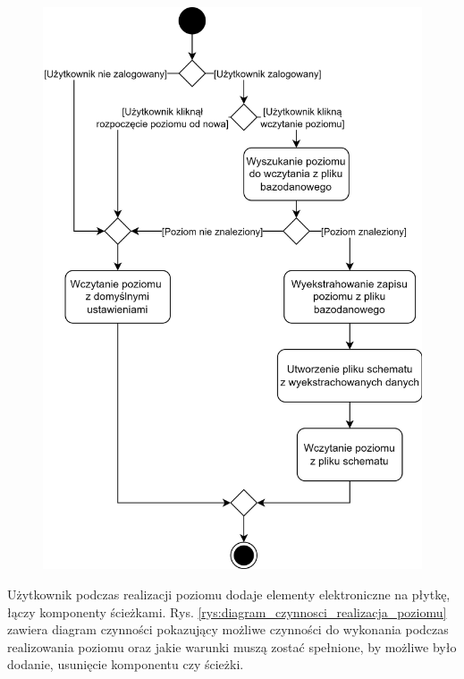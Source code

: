 \documentclass[12pt, a4paper]{article} %
\begin{document}
\begin{figure}[h]
\begin{minipage}{.5\textwidth}
	  \includegraphics[width=.8\textwidth]{images/diagramy_czynnosci/plan-diagram_czynnosci_wczytaj_poziom.png}
	  \label{rys:diagram_czynnosci_wczytaj_poziom}
	\end{minipage}
\end{figure}

\aka Użytkownik podczas realizacji poziomu dodaje elementy elektroniczne na płytkę, łączy komponenty ścieżkami. Rys. \ref{rys:diagram_czynnosci_realizacja_poziomu} zawiera diagram czynności pokazujący możliwe czynności do wykonania podczas realizowania poziomu oraz jakie warunki muszą zostać spełnione, by możliwe było dodanie, usunięcie komponentu czy ścieżki.
\end{document}
